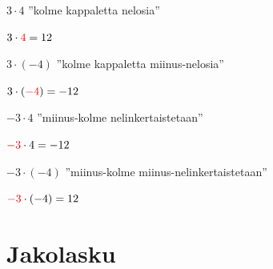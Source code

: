     $3 \cdot 4$ ''kolme kappaletta nelosia''
    
   \begin{center}
    \begin{lukusuora}{-1}{14}{14}
	\color{red} 
	\color{red} 
	\color{red} 

      \end{lukusuora}
      $3\cdot {\color{red}4}=12$
    \end{center}
    
    $3 \cdot (-4)$ ''kolme kappaletta miinus-nelosia''
    
    
    \begin{center}
    \begin{lukusuora}{-13}{2}{14}
	\color{red} 
	\color{red} 
	\color{red} 

      \end{lukusuora}
      $3\cdot ({\color{red}-4})=-12$
    \end{center}
    
    $-3 \cdot 4$ ''miinus-kolme nelinkertaistetaan''
    
    \begin{center}
    \begin{lukusuora}{-13}{2}{14}
	\color{red} 
	\color{red} 
	\color{red} 
	\color{red} 

      \end{lukusuora}
      ${\color{red}-3}\cdot 4=-12$
    \end{center}
    
    $-3 \cdot (-4)$ ''miinus-kolme miinus-nelinkertaistetaan''
    
    \begin{center}
    \begin{lukusuora}{-1}{14}{14}
	\color{red} 
	\color{red} 
	\color{red} 
	\color{red} 

      \end{lukusuora}
      ${\color{red}-3}\cdot (-4)=12$
    \end{center}

\section{Jakolasku}

